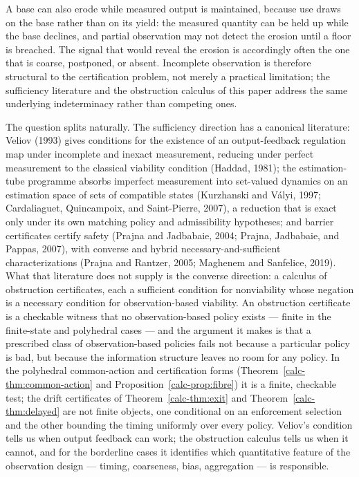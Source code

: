 \documentclass[10pt,twocolumn]{article}
\theoremstyle{definition}
\begin{document}
A base can also erode while measured output is maintained, because
use draws on the base rather than on its yield: the measured quantity
can be held up while the base declines, and partial observation may
not detect the erosion until a floor is breached. The signal that would reveal the erosion is
accordingly often the one that is coarse, postponed, or absent.
Incomplete observation is therefore structural to the certification
problem, not merely a practical limitation; the sufficiency literature
and the obstruction calculus of this paper address the same underlying
indeterminacy rather than competing ones.

The question splits naturally. The sufficiency direction has a canonical literature: Veliov (1993) gives conditions for the existence of an output-feedback regulation map under incomplete and inexact measurement, reducing under perfect measurement to the classical viability condition (Haddad, 1981); the estimation-tube programme absorbs imperfect measurement into set-valued dynamics on an estimation space of sets of compatible states (Kurzhanski and V\'alyi, 1997; Cardaliaguet, Quincampoix, and Saint-Pierre, 2007), a reduction that is exact only under its own matching policy and admissibility hypotheses; and barrier certificates certify safety (Prajna and Jadbabaie, 2004; Prajna, Jadbabaie, and Pappas, 2007), with converse and hybrid necessary-and-sufficient characterizations (Prajna and Rantzer, 2005; Maghenem and Sanfelice, 2019). What that literature does not supply is the converse direction: a calculus of obstruction certificates, each a sufficient condition for nonviability whose negation is a necessary condition for observation-based viability. An obstruction certificate is a checkable witness that no observation-based policy exists --- finite in the finite-state and polyhedral cases --- and the argument it makes is that a prescribed class of observation-based policies fails not because a particular policy is bad, but because the information structure leaves no room for any policy. In the polyhedral common-action and certification forms (Theorem~\ref{calc-thm:common-action} and Proposition~\ref{calc-prop:fibre}) it is a finite, checkable test; the drift certificates of Theorem~\ref{calc-thm:exit} and Theorem~\ref{calc-thm:delayed} are not finite objects, one conditional on an enforcement selection and the other bounding the timing uniformly over every policy. Veliov's condition tells us when output feedback can work; the obstruction calculus tells us when it cannot, and for the borderline cases it identifies which quantitative feature of the observation design --- timing, coarseness, bias, aggregation --- is responsible.
\end{document}
